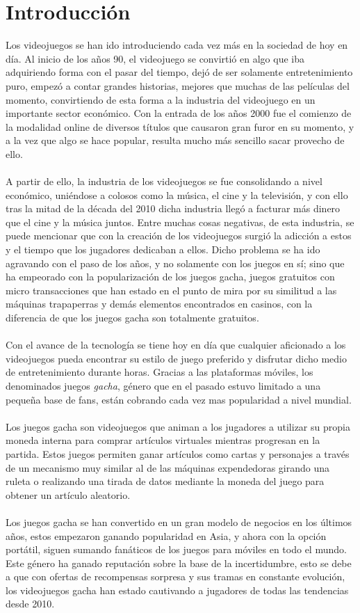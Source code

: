 \documentclass[osajnl,twocolumn,showpacs,superscriptaddress,10pt]{revtex4-2}
\begin{document}
\section{Introducción}
Los videojuegos se han ido introduciendo cada vez más en la sociedad de hoy en día. Al inicio de los años 90, el videojuego se convirtió en algo que iba adquiriendo forma con el pasar del tiempo, dejó de ser solamente entretenimiento puro, empezó a contar grandes historias, mejores que muchas de las películas del momento, convirtiendo de esta forma a la industria del videojuego en un importante sector económico. Con la entrada de los años 2000 fue el comienzo de la modalidad online de diversos títulos que causaron gran furor en su momento, y a la vez que algo se hace popular, resulta mucho más sencillo sacar provecho de ello.
\\\\
A partir de ello, la industria de los videojuegos se fue consolidando a nivel económico, uniéndose a colosos como la música, el cine y la televisión, y con ello tras la mitad de la década del 2010 dicha industria llegó a facturar más dinero que el cine y la música juntos\cite{ONTSI}. Entre muchas cosas negativas, de esta industria, se puede mencionar que con la creación de los videojuegos surgió la adicción a estos y el tiempo que los jugadores dedicaban a ellos. Dicho problema se ha ido agravando con el paso de los años, y no solamente con los juegos en sí; sino que ha empeorado con la popularización de los juegos gacha, juegos gratuitos con micro transacciones que han estado en el punto de mira por su similitud a las máquinas trapaperras y demás elementos encontrados en casinos, con la diferencia de que los juegos gacha son totalmente gratuitos\cite{Navarro}.
\\\\
Con el avance de la tecnología se tiene hoy en día que cualquier aficionado a los videojuegos pueda encontrar su estilo de juego preferido y disfrutar dicho medio de entretenimiento durante horas. Gracias a las plataformas móviles, los denominados juegos \textit{gacha}, género que en el pasado estuvo limitado a una pequeña base de fans, están cobrando cada vez mas popularidad a nivel mundial.
\\\\
Los juegos gacha son videojuegos que animan a los jugadores a utilizar su propia moneda interna para comprar artículos virtuales mientras progresan en la partida. Estos juegos permiten ganar artículos como cartas y personajes a través de un mecanismo muy similar al de las máquinas expendedoras girando una ruleta o realizando una tirada de datos mediante la moneda del juego para obtener un artículo aleatorio. \cite{gacha}
\\\\
Los juegos gacha se han convertido en un gran modelo de negocios en los últimos años, estos empezaron ganando popularidad en Asia, y ahora con la opción portátil, siguen sumando fanáticos de los juegos para móviles en todo el mundo. Este género ha ganado reputación sobre la base de la incertidumbre, esto se debe a que con ofertas de recompensas sorpresa y sus tramas en constante evolución, los videojuegos gacha han estado cautivando a jugadores de todas las tendencias desde 2010. \cite{gacha02}
\end{document}
